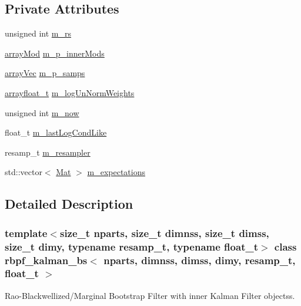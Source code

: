 \subsection*{Private Attributes}
\begin{DoxyCompactItemize}
\item 
unsigned int \hyperlink{classrbpf__kalman__bs_a0d8b3393bb7cb301a6719e56d2c646a9}{m\+\_\+rs}
\item 
\hyperlink{classrbpf__kalman__bs_a009e7dcc39c6a256a6de6ce36df7d033}{array\+Mod} \hyperlink{classrbpf__kalman__bs_a15975ae1d3e70b7bac82f09139d07250}{m\+\_\+p\+\_\+inner\+Mods}
\item 
\hyperlink{classrbpf__kalman__bs_ae4f4df4fb0cffea207901b0d358a519b}{array\+Vec} \hyperlink{classrbpf__kalman__bs_a301e07b418473f266af0b4ad05e82a04}{m\+\_\+p\+\_\+samps}
\item 
\hyperlink{classrbpf__kalman__bs_ae45e5522570234a1126f28fbe6a13c75}{arrayfloat\+\_\+t} \hyperlink{classrbpf__kalman__bs_a2f61f3dca55d4c7f32b408569a75f464}{m\+\_\+log\+Un\+Norm\+Weights}
\item 
unsigned int \hyperlink{classrbpf__kalman__bs_a84dfd5c00db5f3772430498585b776d6}{m\+\_\+now}
\item 
float\+\_\+t \hyperlink{classrbpf__kalman__bs_afb9c933b188a5bb70a35ab404515bde2}{m\+\_\+last\+Log\+Cond\+Like}
\item 
resamp\+\_\+t \hyperlink{classrbpf__kalman__bs_a9ec4d8c343bb45953ef2eac0e0e3210b}{m\+\_\+resampler}
\item 
std\+::vector$<$ \hyperlink{classrbpf__kalman__bs_add5db33a27f25ec3e72ecd8e4c9ce755}{Mat} $>$ \hyperlink{classrbpf__kalman__bs_abf448200e8922c6efa03d18b58712a39}{m\+\_\+expectations}
\end{DoxyCompactItemize}


\subsection{Detailed Description}
\subsubsection*{template$<$size\+\_\+t nparts, size\+\_\+t dimnss, size\+\_\+t dimss, size\+\_\+t dimy, typename resamp\+\_\+t, typename float\+\_\+t$>$\newline
class rbpf\+\_\+kalman\+\_\+bs$<$ nparts, dimnss, dimss, dimy, resamp\+\_\+t, float\+\_\+t $>$}

Rao-\/\+Blackwellized/\+Marginal Bootstrap Filter with inner Kalman Filter objectss. 

